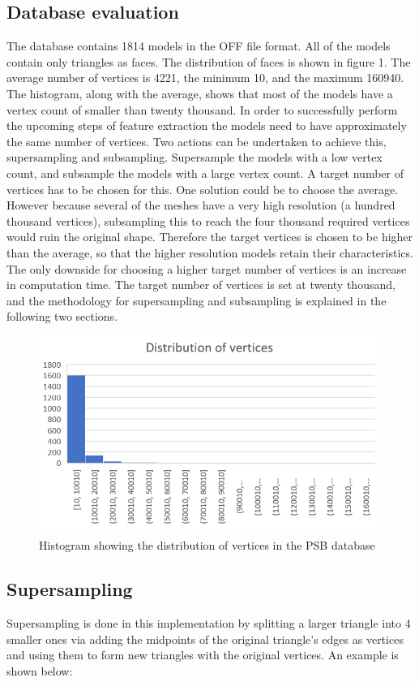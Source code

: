 \documentclass{bigdata}
\begin{document}
\subsection{Database evaluation}
The database contains 1814 models in the OFF file format. All of the models contain only triangles as faces. The distribution of faces is shown in figure 1. The average number of vertices is 4221, the minimum 10, and the maximum 160940. The histogram, along with the average, shows that most of the models have a vertex count of smaller than twenty thousand. In order to successfully perform the upcoming steps of feature extraction the models need to have approximately the same number of vertices. Two actions can be undertaken to achieve this, supersampling and subsampling. Supersample the models with a low vertex count, and subsample the models with a large vertex count. A target number of vertices has to be chosen for this. One solution could be to choose the average. However because several of the meshes have a very high resolution (a hundred thousand vertices), subsampling this to reach the four thousand required vertices would ruin the original shape. Therefore the target vertices is chosen to be higher than the average, so that the higher resolution models retain their characteristics. The only downside for choosing a higher target number of vertices is an increase in computation time. The target number of vertices is set at twenty thousand, and the methodology for supersampling and subsampling is explained in the following two sections.

\begin{figure}[h!]
  \centering
    \includegraphics[width=0.7\linewidth]{Pictures/verticesHist.png}
    \caption{Histogram showing the distribution of vertices in the PSB database}
\end{figure}

\subsection{Supersampling}
Supersampling is done in this implementation by splitting a larger triangle into 4 smaller ones via adding the midpoints of the original triangle’s edges as vertices and using them to form new triangles with the original vertices. An example is shown below:
\end{document}

